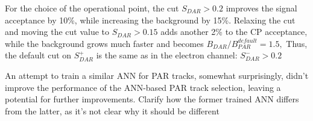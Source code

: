  {\blue For} the choice of the operational point, {\blue the} cut $S_{DAR} > 0.2$ improves the signal acceptance
by 10\%, while increasing the background by 15\%. Relaxing the cut and moving the cut value
to $S_{DAR} > 0.15$ adds another 2\% to the CP acceptance, while the background grows much faster
and becomes $B_{DAR}/B_{PAR}^{default} = 1.5,$
Thus, the default cut on  {\blue $S_{DAR}^+$} is the same as in the electron channel:  $S_{DAR}^- > 0.2$

An attempt to train a similar ANN for PAR tracks, somewhat surprisingly, didn't improve the performance
of the ANN-based PAR track selection, leaving a potential for further improvements. 
{\blue Clarify how the former trained ANN differs from the latter, as it's not clear why it should be different}

